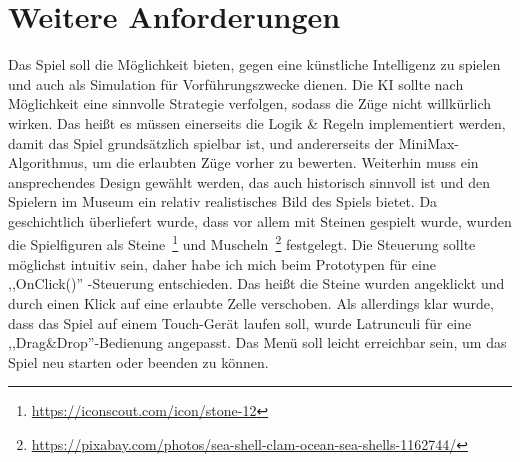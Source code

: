 \section{Weitere Anforderungen}
\label{ch:Analyse:sec:Anforderungen}
Das Spiel soll die Möglichkeit bieten, gegen eine künstliche Intelligenz zu spielen und auch als Simulation für Vorführungszwecke dienen. Die KI sollte nach Möglichkeit eine sinnvolle Strategie verfolgen, sodass die Züge nicht willkürlich wirken. Das heißt es müssen einerseits die Logik \& Regeln implementiert werden, damit das Spiel grundsätzlich spielbar ist, und andererseits der MiniMax-Algorithmus, um die erlaubten Züge vorher zu bewerten. Weiterhin muss ein ansprechendes Design gewählt werden, das auch historisch sinnvoll ist und den Spielern im Museum ein relativ realistisches Bild des Spiels bietet. Da geschichtlich überliefert wurde, dass vor allem mit Steinen gespielt wurde, wurden die Spielfiguren als Steine~\footnote{\url{https://iconscout.com/icon/stone-12}} und Muscheln~\footnote{\url{https://pixabay.com/photos/sea-shell-clam-ocean-sea-shells-1162744/}} festgelegt. Die Steuerung sollte möglichst intuitiv sein, daher habe ich mich beim Prototypen für eine ,,OnClick()'' -Steuerung entschieden. Das heißt die Steine wurden angeklickt und durch einen Klick auf eine erlaubte Zelle verschoben. Als allerdings klar wurde, dass das Spiel auf einem Touch-Gerät laufen soll, wurde Latrunculi für eine ,,Drag\&Drop''-Bedienung angepasst. Das Menü soll leicht erreichbar sein, um das Spiel neu starten oder beenden zu können.






